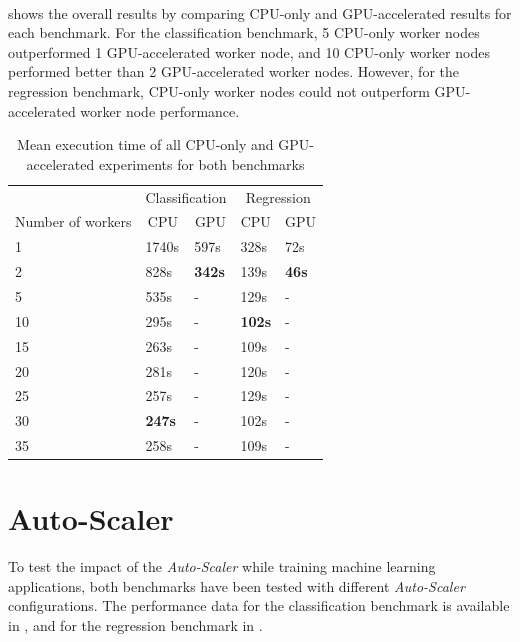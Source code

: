 \paragraph{}
 shows the overall results by comparing CPU-only and GPU-accelerated results for each benchmark.
For the classification benchmark, 5 CPU-only worker nodes outperformed 1 GPU-accelerated worker node, and 10 CPU-only worker nodes performed better than 2 GPU-accelerated worker nodes.
However, for the regression benchmark, CPU-only worker nodes could not outperform GPU-accelerated worker node performance.
\begin{table}[ht]
\centering
\begin{tabular}{@{}l|ll|ll@{}}
\toprule
                  & \multicolumn{2}{c|}{Classification}                & \multicolumn{2}{c}{Regression}                    \\
Number of workers & \multicolumn{1}{c}{CPU} & \multicolumn{1}{c|}{GPU} & \multicolumn{1}{c}{CPU} & \multicolumn{1}{c}{GPU} \\ \midrule
1  & 1740s         & 597s          & 328s          & 72s \\
2  & 828s          & \textbf{342s} & 139s          & \textbf{46s} \\
5  & 535s          & -             & 129s          & -     \\
10 & 295s          & -             & \textbf{102s} & -     \\
15 & 263s          & -             & 109s          & -     \\
20 & 281s          & -             & 120s          & -     \\
25 & 257s          & -             & 129s          & -     \\
30 & \textbf{247s} & -             & 102s          & -     \\
35 & 258s          & -             & 109s          & -     \\ \bottomrule
\end{tabular}
\caption{Mean execution time of all CPU-only and GPU-accelerated experiments for both benchmarks}
\label{table:07_gpu_overall_results}
\end{table}


\section{Auto-Scaler}
\label{sec:07_auto-scaler}
To test the impact of the \textit{Auto-Scaler} while training machine learning applications, both benchmarks have been tested with different \textit{Auto-Scaler} configurations.
The performance data for the classification benchmark is available in , and for the regression benchmark in .


